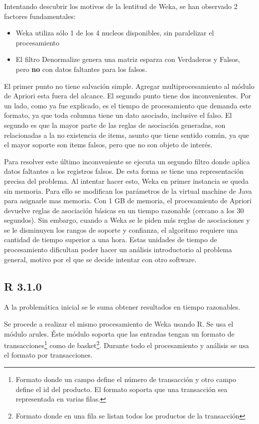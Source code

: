 \documentclass[journal]{IEEEtran}
\begin{document}
Intentando descubrir los motivos de la lentitud de Weka, se han observado 2 factores fundamentales:
\begin{itemize}
	\item Weka utiliza sólo 1 de los 4 nucleos disponibles, sin paralelizar el procesamiento
	\item El filtro Denormalize genera una matriz esparza con Verdaderos y Falsos, pero \textbf{no} con
	datos faltantes para los falsos. 
\end{itemize}

El primer punto no tiene salvación simple. Agregar multiprocesamiento al módulo de Apriori esta
fuera del alcance.
El segundo punto tiene dos inconvenientes. Por un lado, como ya fue explicado, es el tiempo de 
procesamiento que demanda este formato, ya que toda columna tiene un dato asociado, inclusive el falso. 
El segundo es que la mayor parte de las reglas de asociación
generadas, son relacionadas a la no existencia de items, asunto que tiene sentido común, ya que
el mayor soporte son items falsos, pero que no son objeto de interés. 

Para resolver este último inconveniente se ejecuta un segundo filtro donde aplica datos faltantes 
a los registros falsos. De esta forma se tiene una representación precisa del problema. Al intentar 
hacer esto, Weka en primer instancia se queda sin memoria. Para ello se modifican los parámetros de
la virtual machine de Java para asignarle mas memoria. Con 1 GB de memoria, el procesamiento de
Apriori devuelve reglas de asociación básicas en un tiempo razonable (cercano a los 30 segundos). 
Sin embargo, cuando a Weka se le piden más reglas de asociaciones y se le disminuyen los rangos de 
soporte y confianza, el algoritmo requiere una cantidad de tiempo superior a una hora. Estas unidades
de tiempo de procesamiento dificultan poder hacer un análisis introductorio al problema general,
motivo por el que se decide intentar con otro software.


\subsection{R 3.1.0}
A la problemática inicial se le suma obtener resultados en tiempo razonables. 

Se procede a realizar el mismo procesamiento de Weka usando R. Se usa el módulo arules. Éste 
módulo soporta que las entradas tengan un formato de transacciones\footnote{Formato donde un 
campo define el número de transacción y otro campo define el id del producto. El formato
soporta que una transacción sea representada en varias filas.}
como de basket\footnote{Formato donde en una fila se listan todos los productos de la transacción}.
Durante todo el procesamiento y análisis se usa el formato por transacciones.
\end{document}

